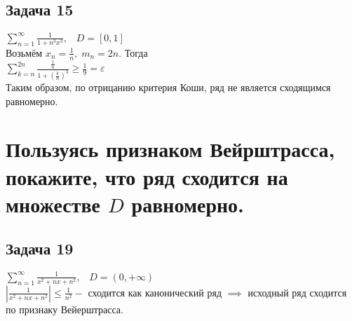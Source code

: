 \documentclass[a4paper, fleqn]{article}
\begin{document}
    \subsection*{Задача 15}
    $\sum\limits_{n = 1}^{\infty} \frac{1}{1 + n^3x^3}, \; \; \; D = [0, 1]$ \\
    Возьмём $x_n = \frac{1}{n}, \; m_n = 2n$. Тогда \\
    $\sum\limits_{k = n}^{2n} \frac{\frac{1}{n}}{1 + (\frac{k}{n})^3} \geq \frac{1}{9} = \varepsilon$ \\
    Таким образом, по отрицанию критерия Коши, ряд не является сходящимся равномерно. \\
    
    
    
    
    \section*{Пользуясь признаком Вейрштрасса, покажите, что ряд сходится на множестве $D$ равномерно.}
    \subsection*{Задача 19}
    $\sum\limits_{n = 1}^{\infty} \frac{1}{x^2 + nx + n^2}, \; \; \; D = (0, +\infty)$ \\
    $\left| \frac{1}{x^2 + nx + n^2} \right| \leq \frac{1}{n^2} - $ сходится как канонический ряд $\implies$ исходный ряд сходится по признаку Вейерштрасса. \\

    
\end{document}
